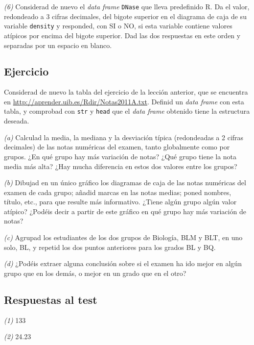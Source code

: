 \documentclass[]{book}
\theoremstyle{definition}
\theoremstyle{definition}
\theoremstyle{definition}
\theoremstyle{remark}
\begin{document}
\emph{(6)} Considerad de nuevo el \emph{data frame} \texttt{DNase} que lleva predefinido R. Da el valor, redondeado a 3 cifras decimales, del bigote superior en el diagrama de caja de su variable \texttt{density} y responded, con SI o NO, si esta variable contiene valores atípicos por encima del bigote superior. Dad las dos respuestas en este orden y separadas por un espacio en blanco.

\hypertarget{ejercicio-9}{%
\subsection*{Ejercicio}\label{ejercicio-9}}

Considerad de nuevo la tabla del ejercicio de la lección anterior, que se encuentra en \url{http://aprender.uib.es/Rdir/Notas2011A.txt}.
Definid un \emph{data frame} con esta tabla, y comprobad con \texttt{str} y \texttt{head} que el \emph{data frame} obtenido tiene la estructura deseada.

\emph{(a)} Calculad la media, la mediana y la desviación típica (redondeadas a 2 cifras decimales) de las notas numéricas del examen, tanto globalmente como por grupos. ¿En qué grupo hay más variación de notas? ¿Qué grupo tiene la nota media más alta? ¿Hay mucha diferencia en estos dos valores entre los grupos?

\emph{(b)} Dibujad en un único gráfico los diagramas de caja de las notas numéricas del examen de cada grupo; añadid marcas en las notas medias; poned nombres, título, etc., para que resulte más informativo. ¿Tiene algún grupo algún valor atípico? ¿Podéis decir a partir de este gráfico en qué grupo hay más variación de notas?

\emph{(c)} Agrupad los estudiantes de los dos grupos de Biología, BLM y BLT, en uno solo, BL, y repetid los dos puntos anteriores para los grados BL y BQ.

\emph{(d)} ¿Podéis extraer alguna conclusión sobre si el examen ha ido mejor en algún grupo que en los demás, o mejor en un grado que en el otro?

\hypertarget{respuestas-al-test-9}{%
\subsection*{Respuestas al test}\label{respuestas-al-test-9}}

\emph{(1)} 133

\emph{(2)} 24.23
\end{document}
